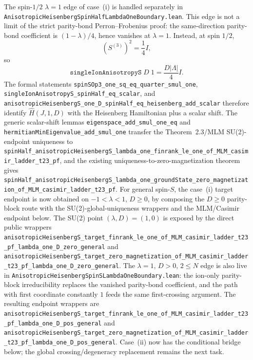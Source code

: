 \documentclass[a4paper,11pt]{article}
\begin{document}
The spin-\(1/2\) \(\lambda=1\) edge of case~(i) is handled separately in
\texttt{AnisotropicHeisenbergSpinHalfLambdaOneBoundary.lean}.  This edge is
not a limit of the strict parity-bond Perron--Frobenius proof: the
same-direction parity-bond coefficient is \((1-\lambda)/4\), hence vanishes at
\(\lambda=1\).  Instead, at spin \(1/2\),
\[
  (S^{(3)})^2 = \frac14 I,
\]
so
\[
  \texttt{singleIonAnisotropyS}\;D\;1
    = \frac{D|\Lambda|}{4} I.
\]
The formal statements
\texttt{spinSOp3\_one\_sq\_eq\_quarter\_smul\_one},
\texttt{singleIonAnisotropyS\_spinHalf\_eq\_scalar}, and
\texttt{anisotropicHeisenbergS\_one\_D\_spinHalf\_eq\_heisenberg\_add\_scalar}
therefore identify \(\hat H(J,1,D)\) with the Heisenberg Hamiltonian plus a
scalar shift.  The generic scalar-shift lemmas
\texttt{eigenspace\_add\_smul\_one\_eq} and
\texttt{hermitianMinEigenvalue\_add\_smul\_one} transfer the Theorem~2.3/MLM
SU(2)-endpoint uniqueness to
\texttt{spinHalf\_anisotropicHeisenbergS\_lambda\_one\_finrank\_le\_one\_of\_MLM\_casimir\_ladder\_t23\_pf},
and the existing uniqueness-to-zero-magnetization theorem gives
\texttt{spinHalf\_anisotropicHeisenbergS\_lambda\_one\_groundState\_zero\_magnetization\_of\_MLM\_casimir\_ladder\_t23\_pf}.
For general spin-\(S\), the case~(i) target endpoint is now obtained on
\(-1<\lambda<1\), \(D\ge0\), by composing the \(D\ge0\) parity-block route with
the SU(2)-global-uniqueness wrappers and the MLM/Casimir endpoint below.  The
SU(2) point \((\lambda,D)=(1,0)\) is exposed by the direct public wrappers
\texttt{anisotropicHeisenbergS\_target\_finrank\_le\_one\_of\_MLM\_casimir\_ladder\_t23\_pf\_lambda\_one\_D\_zero\_general}
and
\texttt{anisotropicHeisenbergS\_target\_zero\_magnetization\_of\_MLM\_casimir\_ladder\_t23\_pf\_lambda\_one\_D\_zero\_general}.
The \(\lambda=1\), \(D>0\), \(2\le N\) edge is also live in
\texttt{AnisotropicHeisenbergSpinSLambdaOneBoundary.lean}: the ion-only
parity-block irreducibility replaces the vanished parity-bond coefficient,
and the path with first coordinate constantly \(1\) feeds the same
first-crossing argument.  The resulting endpoint wrappers are
\texttt{anisotropicHeisenbergS\_target\_finrank\_le\_one\_of\_MLM\_casimir\_ladder\_t23\_pf\_lambda\_one\_D\_pos\_general}
and
\texttt{anisotropicHeisenbergS\_target\_zero\_magnetization\_of\_MLM\_casimir\_ladder\_t23\_pf\_lambda\_one\_D\_pos\_general}.
Case~(ii) now has the conditional bridge below; the global
crossing/degeneracy replacement remains the next task.
\end{document}
